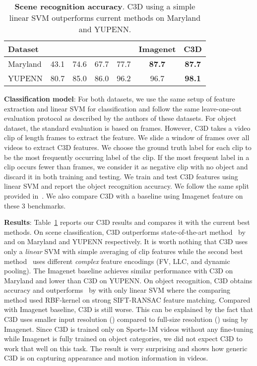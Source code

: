 \documentclass[10pt,twocolumn,letterpaper]{article}
\begin{document}
\begin{table}
\begin{center}
{\small
\begin{tabular}{|l|c|c|c|c|c|c|}
\hline
Dataset & \cite{Derpanis12} & \cite{Theriault13} &  \cite{FeichtenhoferPW13} & \cite{FeichtenhoferPW14} & Imagenet & {\bf C3D} \\
\hline
Maryland & 43.1 & 74.6 &  67.7 & 77.7 & {\bf 87.7} & {\bf 87.7} \\
YUPENN & 80.7 & 85.0 & 86.0 & 96.2 & 96.7 & {\bf 98.1} \\
\hline
\end{tabular}
}
\end{center}
\vspace{-8pt}
\caption{{\bf Scene recognition accuracy}. C3D using a simple linear SVM outperforms current methods on Maryland and YUPENN.}
\vspace{-16pt}
\label{tab:scene_soa}
\end{table}

{\bf Classification model}: For both datasets, we use the same setup of feature extraction and linear SVM for classification and follow the same leave-one-out evaluation protocol as described by the authors of these datasets. For object dataset, the standard evaluation is based on frames. However, C3D takes a video clip of length  frames to extract the feature. We slide a window of  frames over all videos to extract C3D features. We choose the ground truth label for each clip to be the most frequently occurring label of the clip. If the most frequent label in a clip occurs fewer than  frames, we consider it as negative clip with no object and discard it in both training and testing. We train and test C3D features using linear SVM and report the object recognition accuracy. We follow the same split provided in~\cite{Ren2009}. We also compare C3D with a baseline using Imagenet feature on these 3 benchmarks. 

{\bf Results}: Table~\ref{tab:scene_soa} reports our C3D results and compares it with the current best methods. On scene classification, C3D outperforms state-of-the-art method~\cite{FeichtenhoferPW14} by  and  on Maryland and YUPENN respectively. It is worth nothing that C3D uses only a \emph{linear} SVM with simple averaging of clip features while the second best method~\cite{FeichtenhoferPW14} uses different \emph{complex} feature encodings (FV, LLC, and dynamic pooling). The Imagenet baseline achieves similar performance with C3D on Maryland and  lower than C3D on YUPENN. On object recognition, C3D obtains  accuracy and outperforms~\cite{Ren2009} by  with only linear SVM where the comparing method used RBF-kernel on strong SIFT-RANSAC feature matching. Compared with Imagenet baseline, C3D is still  worse. This can be explained by the fact that C3D uses smaller input resolution () compared to full-size resolution () using by Imagenet. Since C3D is trained only on Sports-1M videos without any fine-tuning while Imagenet is fully trained on  object categories, we did not expect C3D to work that well on this task. The result is very surprising and shows how generic C3D is on capturing appearance and motion information in videos. 
\end{document}

